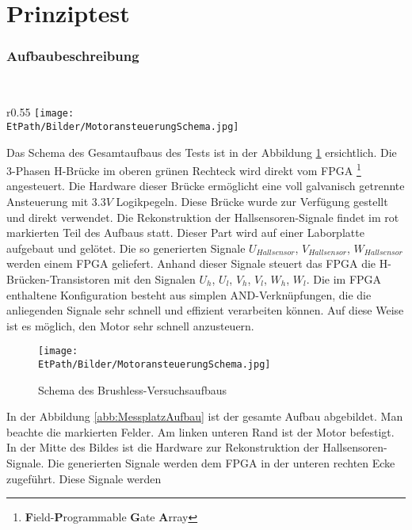 \ifSTANDALONE
\section{Prinziptest}
\fi
\ifEMBED
\subsubsection{Aufbaubeschreibung}
    \BLDCcollab \\
\fi
\ifEMBED
    \begin{wrapfigure}{r}{0.55\textwidth}
       	\texttt{[image: \\EtPath/Bilder/MotoransteuerungSchema.jpg]}
       	\centering
       	\caption{Schema des Brushless-Versuchsaufbaus}
        \label{abb:MotoransteuerungSchema}
    \end{wrapfigure}
\fi
    Das Schema des Gesamtaufbaus des Tests ist in der Abbildung 
    \ref{abb:MotoransteuerungSchema} ersichtlich. Die 3-Phasen H-Brücke im 
    oberen grünen Rechteck wird direkt vom FPGA 
    \footnote{\textbf{F}ield-\textbf{P}rogrammable \textbf{G}ate 
    \textbf{A}rray} angesteuert. Die Hardware dieser Brücke ermöglicht eine 
    voll galvanisch getrennte Ansteuerung mit $3.3 V$ Logikpegeln. Diese 
    Brücke wurde zur Verfügung gestellt und direkt verwendet. Die 
    Rekonstruktion der Hallsensoren-Signale findet im rot markierten Teil des 
    Aufbaus statt. Dieser Part wird auf einer Laborplatte aufgebaut und 
    gelötet. Die so generierten Signale $U_{Hallsensor}$, $V_{Hallsensor}$, 
    $W_{Hallsensor}$ werden einem FPGA geliefert. Anhand dieser Signale 
    steuert das FPGA die H-Brücken-Transistoren mit den Signalen $U_h$, $U_l$, 
    $V_h$, $V_l$, $W_h$, $W_l$. Die im FPGA enthaltene Konfiguration besteht 
    aus simplen AND-Verknüpfungen, die die anliegenden Signale sehr schnell 
    und effizient verarbeiten können. Auf diese Weise ist es möglich, den 
    Motor sehr schnell anzusteuern.
    \ifSTANDALONE
    \begin{figure}[h!]
    	\texttt{[image: \\EtPath/Bilder/MotoransteuerungSchema.jpg]}
       	\centering
       	\caption{Schema des Brushless-Versuchsaufbaus}
        \label{abb:MotoransteuerungSchema}
    \end{figure}
    \fi
    In der Abbildung \ref{abb:MessplatzAufbau} ist der gesamte Aufbau 
    abgebildet. Man beachte die markierten Felder. Am linken unteren Rand ist 
    der Motor befestigt. In der Mitte des Bildes ist die Hardware zur 
    Rekonstruktion der Hallsensoren-Signale.  Die generierten Signale werden 
    dem FPGA in der unteren rechten Ecke zugeführt. Diese Signale werden 
